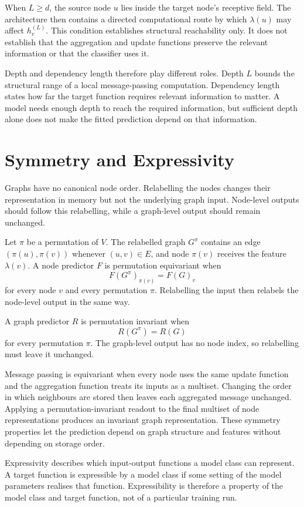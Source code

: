 When $L\geq d$, the source node $u$ lies inside the target node's receptive field.
The architecture then contains a directed computational route by which $\lambda(u)$ may affect $h_v^{(L)}$.
This condition establishes structural reachability only.
It does not establish that the aggregation and update functions preserve the relevant information or that the classifier uses it.

Depth and dependency length therefore play different roles.
Depth $L$ bounds the structural range of a local message-passing computation.
Dependency length states how far the target function requires relevant information to matter.
A model needs enough depth to reach the required information, but sufficient depth alone does not make the fitted prediction depend on that information.

\section{Symmetry and Expressivity}

Graphs have no canonical node order.
Relabelling the nodes changes their representation in memory but not the underlying graph input.
Node-level outputs should follow this relabelling, while a graph-level output should remain unchanged.

Let $\pi$ be a permutation of $V$.
The relabelled graph $G^\pi$ contains an edge $(\pi(u),\pi(v))$ whenever $(u,v)\in E$, and node $\pi(v)$ receives the feature $\lambda(v)$.
A node predictor $F$ is permutation equivariant when
\[
F(G^\pi)_{\pi(v)}=F(G)_v
\]
for every node $v$ and every permutation $\pi$.
Relabelling the input then relabels the node-level output in the same way.

A graph predictor $R$ is permutation invariant when
\[
R(G^\pi)=R(G)
\]
for every permutation $\pi$.
The graph-level output has no node index, so relabelling must leave it unchanged.

Message passing is equivariant when every node uses the same update function and the aggregation function treats its inputs as a multiset.
Changing the order in which neighbours are stored then leaves each aggregated message unchanged.
Applying a permutation-invariant readout to the final multiset of node representations produces an invariant graph representation.
These symmetry properties let the prediction depend on graph structure and features without depending on storage order.

Expressivity describes which input-output functions a model class can represent.
A target function is expressible by a model class if some setting of the model parameters realises that function.
Expressibility is therefore a property of the model class and target function, not of a particular training run.

